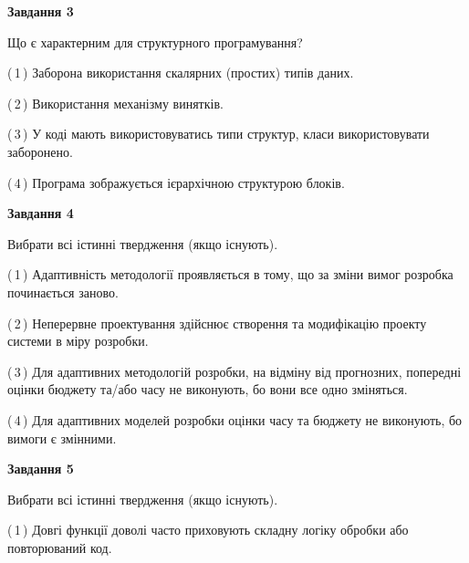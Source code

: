 \documentclass[10pt, ukrainian]{article}
\begin{document}
{\begin {large}
{\begin {center}\textbf{Завдання 3}\end {center}}\par
Що є характерним для структурного програмування?\par
\vspace{2mm}



(\,1\,) Заборона використання скалярних (простих) типів даних. %



(\,2\,) Використання механізму винятків. %



(\,3\,) У коді мають використовуватись типи структур, класи використовувати заборонено. %



(\,4\,) Програма зображується ієрархічною структурою блоків.%


{\begin {center}\textbf{Завдання 4}\end {center}}\par
Вибрати всі істинні твердження (якщо існують).\par
\vspace{2mm}



(\,1\,) Адаптивність методології проявляється в тому, що за зміни вимог розробка починається заново. %



(\,2\,) Неперервне проектування здійснює створення та модифікацію проекту системи в міру розробки. %



(\,3\,) Для адаптивних методологій розробки, на відміну від прогнозних, попередні оцінки бюджету та/або часу не виконують, бо вони все одно зміняться. %



(\,4\,) Для адаптивних моделей розробки оцінки часу та бюджету не виконують, бо вимоги є змінними. %


{\begin {center}\textbf{Завдання 5}\end {center}}\par
Вибрати всі істинні твердження (якщо існують).\par
\vspace{2mm}



(\,1\,) Довгі функції доволі часто приховують складну логіку обробки або повторюваний код. %




\end{large}}
\end{document}
